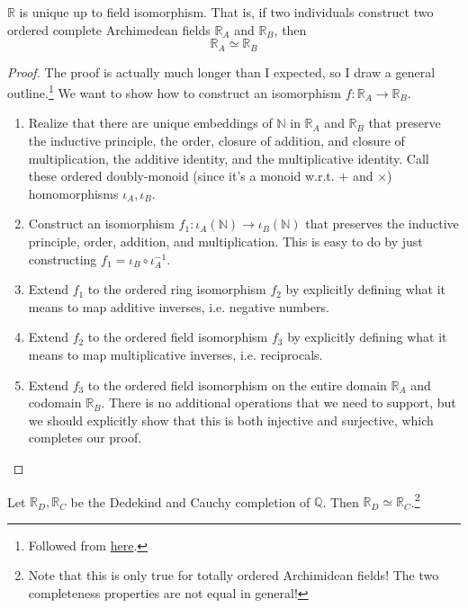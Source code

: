     \begin{theorem}[Uniqueness]
      $\mathbb{R}$ is unique up to field isomorphism. That is, if two individuals construct two ordered complete Archimedean fields $\mathbb{R}_A$ and $\mathbb{R}_B$, then 
      \begin{equation}
        \mathbb{R}_A \simeq \mathbb{R}_B
      \end{equation}
    \end{theorem}  
    \begin{proof}
      The proof is actually much longer than I expected, so I draw a general outline.\footnote{Followed from \href{https://math.ucr.edu/~res/math205A/uniqreals.pdf}{here}.} We want to show how to construct an isomorphism $f: \mathbb{R}_A \rightarrow \mathbb{R}_B$. 
      \begin{enumerate}
        \item Realize that there are unique embeddings of $\mathbb{N}$ in $\mathbb{R}_A$ and $\mathbb{R}_B$ that preserve the inductive principle, the order, closure of addition, and closure of multiplication, the additive identity, and the multiplicative identity. Call these ordered doubly-monoid (since it's a monoid w.r.t. $+$ and $\times$) homomorphisms $\iota_A, \iota_B$. 
        \item Construct an isomorphism $f_1: \iota_A(\mathbb{N}) \rightarrow \iota_B(\mathbb{N})$ that preserves the inductive principle, order, addition, and multiplication. This is easy to do by just constructing $f_1 = \iota_B \circ \iota_A^{-1}$. 
        \item Extend $f_1$ to the ordered ring isomorphism $f_2$ by explicitly defining what it means to map additive inverses, i.e. negative numbers. 
        \item Extend $f_2$ to the ordered field isomorphism $f_3$ by explicitly defining what it means to map multiplicative inverses, i.e. reciprocals. 
        \item Extend $f_3$ to the ordered field isomorphism on the entire domain $\mathbb{R}_A$ and codomain $\mathbb{R}_B$. There is no additional operations that we need to support, but we should explicitly show that this is both injective and surjective, which completes our proof. 
      \end{enumerate}
    \end{proof}

    \begin{corollary}
      Let $\mathbb{R}_D, \mathbb{R}_C$ be the Dedekind and Cauchy completion of $\mathbb{Q}$. Then $\mathbb{R}_D \simeq \mathbb{R}_C$.\footnote{Note that this is only true for totally ordered Archimidean fields! The two completeness properties are not equal in general!}
    \end{corollary}

